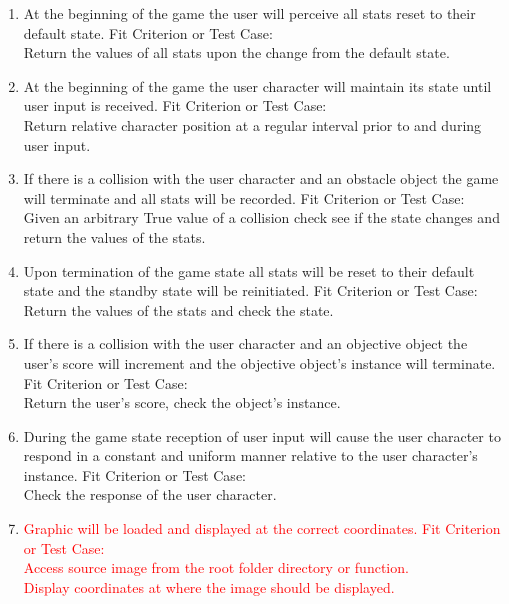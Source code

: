 \documentclass[11pt, oneside]{article}   	%
\begin{document}
\begin{enumerate}
\item
At the beginning of the game the user will perceive all stats reset to their default state.
\subitem
Fit Criterion or Test Case: \\
Return the values of all stats upon the change from the default state.

\item
At the beginning of the game the user character will maintain its state until user input is received.
\subitem
Fit Criterion or Test Case: \\
Return relative character position at a regular interval prior to and during user input.

\item
If there is a collision with the user character and an obstacle object the game will terminate and all stats will be recorded.
\subitem
Fit Criterion or Test Case: \\
Given an arbitrary True value of a collision check see if the state changes and return the values of the stats.

\item
Upon termination of the game state all stats will be reset to their default state and the standby state will be reinitiated.
\subitem
Fit Criterion or Test Case: \\
Return the values of the stats and check the state.

\item
If there is a collision with the user character and an objective object the user's score will increment and the objective object's instance will terminate.
\subitem
Fit Criterion or Test Case: \\
Return the user's score, check the object's instance.

\item
During the game state reception of user input will cause the user character to respond in a constant and uniform manner relative to the user character's instance.
\subitem
Fit Criterion or Test Case: \\
Check the response of the user character.

\item
\textcolor{red}{Graphic will be loaded and displayed at the correct coordinates.}
\subitem
\textcolor{red}{Fit Criterion or Test Case:} \\
\textcolor{red}{Access source image from the root folder directory or function.} \\
\textcolor{red}{Display coordinates at where the image should be displayed.}


\end{enumerate}
\end{document}
